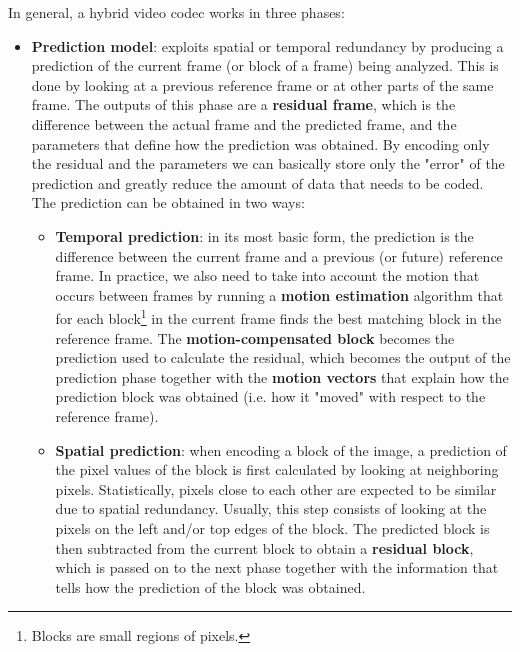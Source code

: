 In general, a hybrid video codec works in three phases:\cite{h264}

\begin{itemize}
    \item \textbf{Prediction model}: exploits spatial or temporal redundancy by producing a prediction of the current frame (or block of a frame) being analyzed. This is done by looking at a previous reference frame or at other parts of the same frame. The outputs of this phase are a \textbf{residual frame}, which is the difference between the actual frame and the predicted frame, and the parameters that define how the prediction was obtained. By encoding only the residual and the parameters we can basically store only the "error" of the prediction and greatly reduce the amount of data that needs to be coded. The prediction can be obtained in two ways:
        \begin{itemize}
            \item \textbf{Temporal prediction}: in its most basic form, the prediction is the difference between the current frame and a previous (or future) reference frame. In practice, we also need to take into account the motion that occurs between frames by running a \textbf{motion estimation} algorithm that for each block\footnote{Blocks are small regions of pixels.} in the current frame finds the best matching block in the reference frame. The \textbf{motion-compensated block} becomes the prediction used to calculate the residual, which becomes the output of the prediction phase together with the \textbf{motion vectors} that explain how the prediction block was obtained (i.e. how it "moved" with respect to the reference frame).
            \item \textbf{Spatial prediction}: when encoding a block of the image, a prediction of the pixel values of the block is first calculated by looking at neighboring pixels. Statistically, pixels close to each other are expected to be similar due to spatial redundancy. Usually, this step consists of looking at the pixels on the left and/or top edges of the block. The predicted block is then subtracted from the current block to obtain a \textbf{residual block}, which is passed on to the next phase together with the information that tells how the prediction of the block was obtained.
        \end{itemize}
        

\end{itemize}
